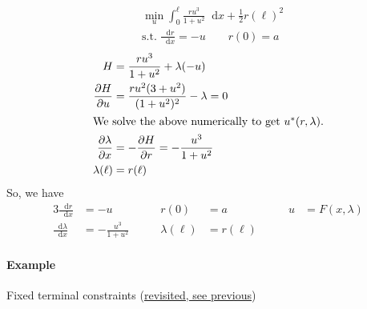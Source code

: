 \documentclass[letterpaper,12pt,titlepage]{report}
\newcommand*\dif{\mathop{}\!\mathrm{d}}
\newcommand*\pder[2]{\frac{\partial #1}{\partial #2}}
\theoremstyle{plain}
\theoremstyle{definition}
\begin{document}
\begin{align}
    & \min_u \int_0^\ell \frac{ru^3}{1+u^2}\dif x + \frac12 r(\ell)^2 \\
    & \text{s.t. } \frac{\dif r}{\dif x} = -u \qquad r(0) = a
\end{align}
\begin{align}
    H &= \frac{ru^3}{1+u^2} + \lambda(-u) \\
    \pder{H}{u} &= \frac{ru^2(3+u^2)}{(1+u^2)^2} - \lambda = 0 \\
    \shortintertext{We solve the above numerically to get $u^*(r,\lambda)$.}
    \pder{\lambda}{x} &= -\pder{H}{r} = -\frac{u^3}{1+u^2} \\
    \lambda(\ell) &= r(\ell)
\end{align}
So, we have
\begin{alignat}{3}
    \frac{\dif r}{\dif x} &= -u & r(0) &= a & u &= F(x,\lambda) \\
    \frac{\dif\lambda}{\dif x} &= -\frac{u^3}{1+u^2} \qquad & \lambda(\ell) &= r(\ell) \qquad
\end{alignat}

\paragraph{Example} Fixed terminal constraints (\hyperlink{fixed_term_cons}{revisited, see previous})
\end{document}
